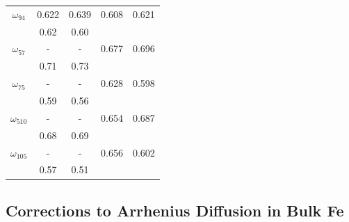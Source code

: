 \documentclass[preprint,12pt]{elsarticle}
\begin{document}
\begin{table}[!ht]
\begin{tabular}{|c|c|c|c|c|}
       \hline
       $\omega_{94}$  &0.622 &0.639 &0.608 &0.621 \\
       & 0.62 \cite{ke2025diffusion}& 0.60 \cite{ke2025diffusion}&&\\
       \hline
       $\omega_{57}$ &- &- &0.677 &0.696 \\
       & 0.71 \cite{ke2025diffusion}& 0.73 \cite{ke2025diffusion}&&\\
       \hline
       $\omega_{75}$  &- &- &0.628 &0.598 \\
       & 0.59 \cite{ke2025diffusion}& 0.56 \cite{ke2025diffusion}&&\\
       \hline
       $\omega_{510}$ &- &- &0.654 &0.687 \\ 
       & 0.68 \cite{ke2025diffusion}& 0.69 \cite{ke2025diffusion}&&\\
       \hline
       $\omega_{105}$  &- &- &0.656 &0.602 \\
       & 0.57 \cite{ke2025diffusion}& 0.51 \cite{ke2025diffusion}&&\\
       \hline
    \end{tabular}
\end{table}



\FloatBarrier
\subsection{Corrections to Arrhenius Diffusion in Bulk Fe}
\end{document}
